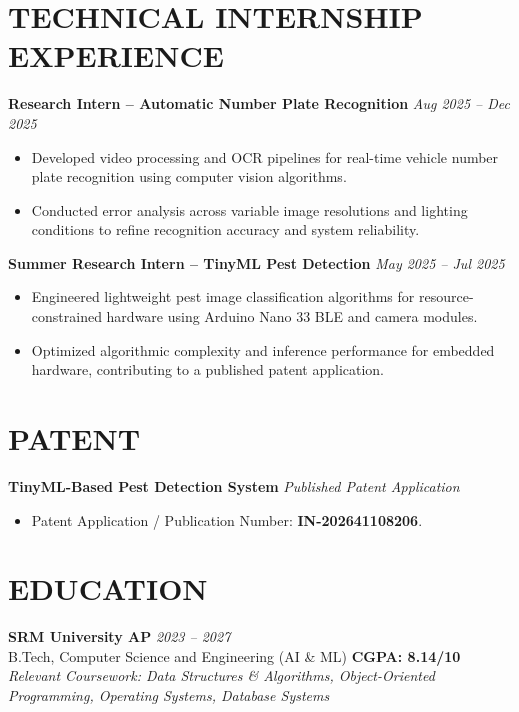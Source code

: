 \documentclass[a4paper,10pt]{article}
\begin{document}
\section*{TECHNICAL INTERNSHIP EXPERIENCE}

\textbf{Research Intern -- Automatic Number Plate Recognition}
\hfill
\textit{Aug 2025 -- Dec 2025}

\begin{itemize}
    \item Developed video processing and OCR pipelines for real-time vehicle number plate recognition using computer vision algorithms.
    \item Conducted error analysis across variable image resolutions and lighting conditions to refine recognition accuracy and system reliability.
\end{itemize}

\textbf{Summer Research Intern -- TinyML Pest Detection}
\hfill
\textit{May 2025 -- Jul 2025}

\begin{itemize}
    \item Engineered lightweight pest image classification algorithms for resource-constrained hardware using Arduino Nano 33 BLE and camera modules.
    \item Optimized algorithmic complexity and inference performance for embedded hardware, contributing to a published patent application.
\end{itemize}

\section*{PATENT}

\textbf{TinyML-Based Pest Detection System}
\hfill
\textit{Published Patent Application}

\begin{itemize}
    \item Patent Application / Publication Number: \textbf{IN-202641108206}.
\end{itemize}

\section*{EDUCATION}

\textbf{SRM University AP}
\hfill
\textit{2023 -- 2027}\\
B.Tech, Computer Science and Engineering (AI \& ML)
\hfill
\textbf{CGPA: 8.14/10}\\
\textit{Relevant Coursework: Data Structures \& Algorithms, Object-Oriented Programming, Operating Systems, Database Systems}
\end{document}
